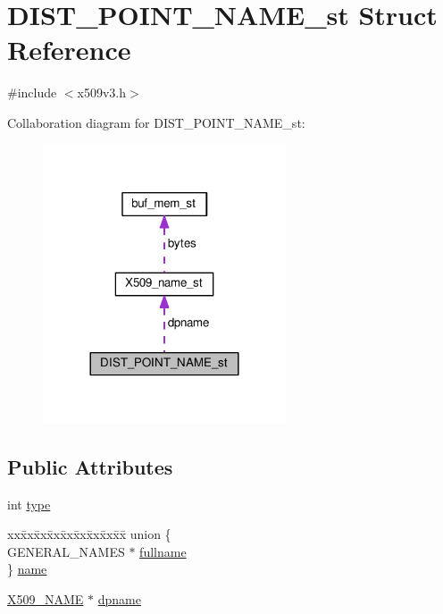 \hypertarget{struct_d_i_s_t___p_o_i_n_t___n_a_m_e__st}{}\section{D\+I\+S\+T\+\_\+\+P\+O\+I\+N\+T\+\_\+\+N\+A\+M\+E\+\_\+st Struct Reference}
\label{struct_d_i_s_t___p_o_i_n_t___n_a_m_e__st}


{\ttfamily \#include $<$x509v3.\+h$>$}



Collaboration diagram for D\+I\+S\+T\+\_\+\+P\+O\+I\+N\+T\+\_\+\+N\+A\+M\+E\+\_\+st\+:
\nopagebreak
\begin{figure}[H]
\begin{center}
\leavevmode
\includegraphics[width=204pt]{struct_d_i_s_t___p_o_i_n_t___n_a_m_e__st__coll__graph}
\end{center}
\end{figure}
\subsection*{Public Attributes}
\begin{DoxyCompactItemize}
\item 
int \hyperlink{struct_d_i_s_t___p_o_i_n_t___n_a_m_e__st_a86c9aa0170afe2c241c5536f45d15b46}{type}
\item 
\begin{tabbing}
xx\=xx\=xx\=xx\=xx\=xx\=xx\=xx\=xx\=\kill
union \{\\
\>GENERAL\_NAMES $\ast$ \hyperlink{struct_d_i_s_t___p_o_i_n_t___n_a_m_e__st_a7aeffaa93b5fe1663f2b9fc7cfe0ce5e}{fullname}\\
\} \hyperlink{struct_d_i_s_t___p_o_i_n_t___n_a_m_e__st_ab4a8893d4d62d133fc75747aa79acd3d}{name}\\

\end{tabbing}\item 
\hyperlink{ossl__typ_8h_a5c5fc036757e87b9bd163d0221696533}{X509\+\_\+\+N\+A\+ME} $\ast$ \hyperlink{struct_d_i_s_t___p_o_i_n_t___n_a_m_e__st_a59bb0b428b4067a642f1fecfce319600}{dpname}
\end{DoxyCompactItemize}


